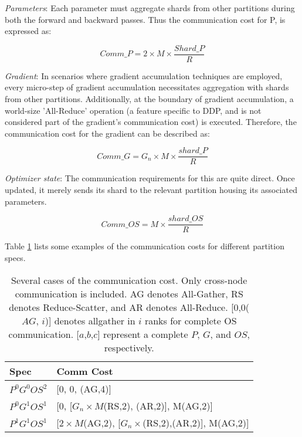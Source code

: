 
\emph{Parameters}: Each parameter must aggregate shards from other partitions during both the forward and backward passes. Thus the communication cost for P, is expressed as:


\[ Comm\_P = 2 \times M \times \frac{Shard\_P}{R} \]

\emph{Gradient}: In scenarios where gradient accumulation techniques are employed, every micro-step of gradient accumulation necessitates aggregation with shards from other partitions. Additionally, at the boundary of gradient accumulation, a world-size 'All-Reduce' operation (a feature specific to DDP, and is not considered part of the gradient's communication cost) is executed. 
Therefore, the communication cost for the gradient can be described as:


\[Comm\_G = G_n \times M \times \frac{shard\_P}{R}\]


\emph{Optimizer state}: The communication requirements for this are quite direct. Once updated, it merely sends its shard to the relevant partition housing its associated parameters.

\[ Comm\_OS = M \times \frac{shard\_OS}{R} \]

Table \ref{exampleComm} lists some examples of the communication costs for different partition specs.

\begin{table}[]
    \centering
    \vspace{-15pt}
    \renewcommand{\arraystretch}{1.4}
\begin{tabular}{@{}ll@{}}
\toprule

Spec    & Comm Cost                                                   \\ \midrule
$P^0G^0OS^2$ & {[}0, 0, (AG,4){]}                                            \\
$P^0G^1OS^1$ & {[}0, {[}$G_n\times M$(RS,2), (AR,2){]}, M(AG,2){]} \\
$P^1G^1OS^1$ & {[}{$2\times M$(AG,2)}, {[}$G_n\times$(RS,2),(AR,2){]}, M(AG,2){]} \\ \bottomrule
\end{tabular}

\caption{Several cases of the communication cost. Only cross-node communication is included. AG denotes All-Gather, RS denotes Reduce-Scatter, and AR denotes All-Reduce. [0,0($AG$, $i$)] denotes allgather in $i$ ranks for complete OS communication. [$a$,$b$,$c$] represent a complete $P$, $G$, and $OS$, respectively.}
\label{exampleComm}
\end{table}

